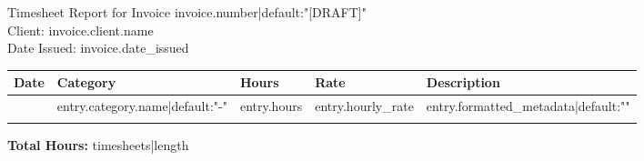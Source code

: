\documentclass{article}
\begin{document}
\begin{center}
    \LARGE Timesheet Report for Invoice {{ invoice.number|default:"[DRAFT]" }} \\
    \large Client: {{ invoice.client.name }} \\
    \large Date Issued: {{ invoice.date_issued }}
\end{center}

\vspace{1em}

\begin{longtable}{@{}lllll@{}}
\toprule
Date & Category & Hours & Rate & Description \\
\midrule
\endhead
{%
{{ entry.date }} & {{ entry.category.name|default:"-" }} & {{ entry.hours }} & {{ entry.hourly_rate }} & {{ entry.formatted_metadata|default:"" }} \\
{%
\bottomrule
\end{longtable}

\vspace{1em}
\textbf{Total Hours:} {{ timesheets|length }}
\end{document}

